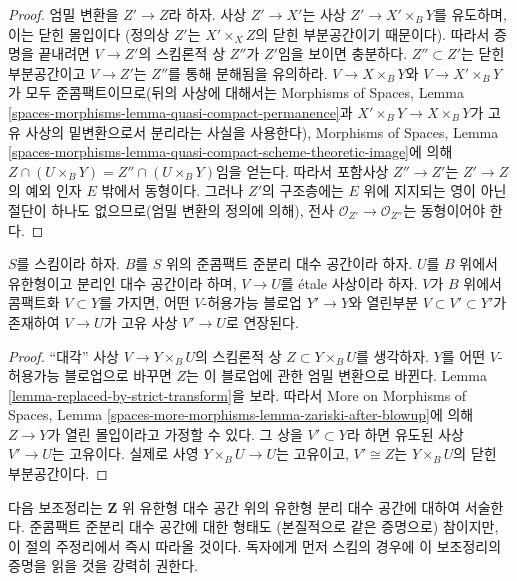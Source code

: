 \begin{proof}
엄밀 변환을 $Z' \to Z$라 하자. 사상 $Z' \to X'$는 사상
$Z' \to X' \times_B Y$를 유도하며, 이는 닫힌 몰입이다
(정의상 $Z'$는 $X' \times_X Z$의 닫힌 부분공간이기 때문이다).
따라서 증명을 끝내려면 $V \to Z'$의 스킴론적 상 $Z''$가
$Z'$임을 보이면 충분하다. $Z'' \subset Z'$는 닫힌 부분공간이고
$V \to Z'$는 $Z''$를 통해 분해됨을 유의하라.
$V \to X \times_B Y$와 $V \to X' \times_B Y$가 모두
준콤팩트이므로(뒤의 사상에 대해서는 Morphisms of Spaces, Lemma
\ref{spaces-morphisms-lemma-quasi-compact-permanence}과
$X' \times_B Y \to X \times_B Y$가 고유 사상의 밑변환으로서
분리라는 사실을 사용한다), Morphisms of Spaces, Lemma
\ref{spaces-morphisms-lemma-quasi-compact-scheme-theoretic-image}에 의해
$Z \cap (U \times_B Y) = Z'' \cap (U \times_B Y)$임을 얻는다.
따라서 포함사상 $Z'' \to Z'$는 $Z' \to Z$의 예외 인자 $E$ 밖에서
동형이다. 그러나 $Z'$의 구조층에는 $E$ 위에 지지되는 영이 아닌
절단이 하나도 없으므로(엄밀 변환의 정의에 의해), 전사
$\mathcal{O}_{Z'} \to \mathcal{O}_{Z''}$는 동형이어야 한다.
\end{proof}

\begin{lemma}
\label{lemma-compactification-dominates}
$S$를 스킴이라 하자. $B$를 $S$ 위의 준콤팩트 준분리 대수 공간이라
하자. $U$를 $B$ 위에서 유한형이고 분리인 대수 공간이라 하며,
$V \to U$를 \'etale 사상이라 하자. $V$가 $B$ 위에서 콤팩트화
$V \subset Y$를 가지면, 어떤 $V$-허용가능 블로업 $Y' \to Y$와
열린부분 $V \subset V' \subset Y'$가 존재하여 $V \to U$가
고유 사상 $V' \to U$로 연장된다.
\end{lemma}

\begin{proof}
“대각” 사상 $V \to Y \times_B U$의 스킴론적 상
$Z \subset Y \times_B U$를 생각하자. $Y$를 어떤 $V$-허용가능
블로업으로 바꾸면 $Z$는 이 블로업에 관한 엄밀 변환으로 바뀐다.
Lemma \ref{lemma-replaced-by-strict-transform}을 보라. 따라서
More on Morphisms of Spaces, Lemma
\ref{spaces-more-morphisms-lemma-zariski-after-blowup}에 의해
$Z \to Y$가 열린 몰입이라고 가정할 수 있다.
그 상을 $V' \subset Y$라 하면 유도된 사상 $V' \to U$는 고유이다.
실제로 사영 $Y \times_B U \to U$는 고유이고,
$V' \cong Z$는 $Y \times_B U$의 닫힌 부분공간이다.
\end{proof}

\noindent
다음 보조정리는 $\mathbf{Z}$ 위 유한형 대수 공간 위의 유한형
분리 대수 공간에 대하여 서술한다. 준콤팩트 준분리 대수 공간에 대한
형태도 (본질적으로 같은 증명으로) 참이지만, 이 절의 주정리에서
즉시 따라올 것이다. 독자에게 먼저 스킴의 경우에 이 보조정리의
증명을 읽을 것을 강력히 권한다.

